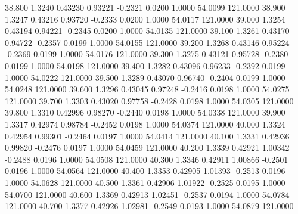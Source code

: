   38.800   1.3240   0.43230   0.93221  -0.2321   0.0200   1.0000  54.0099 121.0000
  38.900   1.3247   0.43216   0.93720  -0.2333   0.0200   1.0000  54.0117 121.0000
  39.000   1.3254   0.43194   0.94221  -0.2345   0.0200   1.0000  54.0135 121.0000
  39.100   1.3261   0.43170   0.94722  -0.2357   0.0199   1.0000  54.0155 121.0000
  39.200   1.3268   0.43146   0.95224  -0.2369   0.0199   1.0000  54.0176 121.0000
  39.300   1.3275   0.43121   0.95728  -0.2380   0.0199   1.0000  54.0198 121.0000
  39.400   1.3282   0.43096   0.96233  -0.2392   0.0199   1.0000  54.0222 121.0000
  39.500   1.3289   0.43070   0.96740  -0.2404   0.0199   1.0000  54.0248 121.0000
  39.600   1.3296   0.43045   0.97248  -0.2416   0.0198   1.0000  54.0275 121.0000
  39.700   1.3303   0.43020   0.97758  -0.2428   0.0198   1.0000  54.0305 121.0000
  39.800   1.3310   0.42996   0.98270  -0.2440   0.0198   1.0000  54.0338 121.0000
  39.900   1.3317   0.42974   0.98784  -0.2452   0.0198   1.0000  54.0374 121.0000
  40.000   1.3324   0.42954   0.99301  -0.2464   0.0197   1.0000  54.0414 121.0000
  40.100   1.3331   0.42936   0.99820  -0.2476   0.0197   1.0000  54.0459 121.0000
  40.200   1.3339   0.42921   1.00342  -0.2488   0.0196   1.0000  54.0508 121.0000
  40.300   1.3346   0.42911   1.00866  -0.2501   0.0196   1.0000  54.0564 121.0000
  40.400   1.3353   0.42905   1.01393  -0.2513   0.0196   1.0000  54.0628 121.0000
  40.500   1.3361   0.42906   1.01922  -0.2525   0.0195   1.0000  54.0700 121.0000
  40.600   1.3369   0.42913   1.02451  -0.2537   0.0194   1.0000  54.0784 121.0000
  40.700   1.3377   0.42926   1.02981  -0.2549   0.0193   1.0000  54.0879 121.0000
